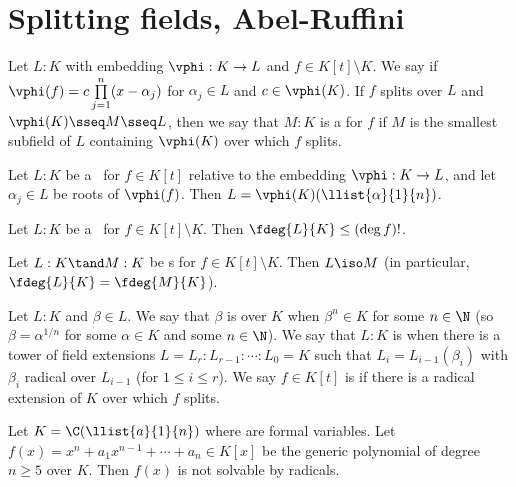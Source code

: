 \documentclass[a4paper]{article}
\begin{document}
\section{Splitting fields, Abel-Ruffini}
\begin{tdefinition}
  Let \( L:K \) with embedding \( \vphi:K\to L \) and \( f\in K[t]\setminus K \).
  We say  if \( \vphi(f) = c\prod\limits_{j=1}^n (x-\alpha_j) \) for \( \alpha_j \in L \) and \( c\in \vphi(K) \).
  If \( f \) splits over \( L \) and \( \vphi(K)\sseq M\sseq L \), then we say that \( M:K \) is a \tul{\sfe} for \( f \) if \( M \) is the smallest subfield of \( L \) containing \( \vphi(K) \) over which \( f \) splits.
\end{tdefinition}

\begin{tlemma}
  Let \( L:K \) be a \sfe~for \( f\in K[t] \) relative to the embedding \( \vphi:K\to L \), and let \( \alpha_j\in L \) be roots of \( \vphi(f) \).
  Then \( L=\vphi(K)(\llist{\alpha}{1}{n}) \).
\end{tlemma}

\begin{tlemma}
  Let \( L:K \) be a \sfe~for \( f\in K[t]\setminus K \).
  Then \( \fdeg{L}{K}\leq (\deg f)! \).
\end{tlemma}

\begin{tlemma}
  Let \( L:K \tand M:K \) be  \sfe s for \( f\in K[t]\setminus K \).
  Then \( L\iso M \) (in particular, \( \fdeg{L}{K}=\fdeg{M}{K} \)).
\end{tlemma}

\begin{tdefinition}
  Let \( L:K \) and \( \beta \in L \).
  We say that \( \beta \) is  over \( K \) when \( \beta^n \in K \) for some \( n \in \N \) (so \( \beta = \alpha^{1/n} \) for some \( \alpha \in K \) and some \( n \in \N \)).
  We say that \( L:K \) is  when there is a tower of field extensions \( L = L_r : L_{r-1} : \cdots : L_0 = K \) such that \( L_i = L_{i-1}(\beta_i) \) with \( \beta_i \) radical over \( L_{i-1} \) (for \( 1 \leq i \leq r \)).
  We say \( f \in K[t] \) is  if there is a radical extension of \( K \) over which \( f \) splits.
\end{tdefinition}

\begin{ttheorem}
  Let \( K=\C(\llist{a}{1}{n}) \) where  are formal variables.
  Let \( f(x) = x^n+a_1x^{n-1}+\cdots+a_n \in K[x] \) be the generic polynomial of degree \( n\geq 5 \) over \( K \).
  Then \( f(x) \) is not solvable by radicals.
\end{ttheorem}
\end{document}
